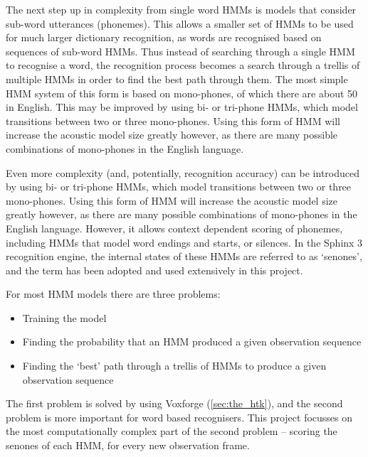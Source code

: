 		The next step up in complexity from single word HMMs is models that consider sub-word utterances (phonemes).  This allows a smaller set of HMMs to be used for much larger dictionary recognition, as words are recognised based on sequences of sub-word HMMs.  Thus instead of searching through a single HMM to recognise a word, the recognition process becomes a search through a trellis of multiple HMMs in order to find the best path through them.  The most simple HMM system of this form is based on mono-phones, of which there are about 50 in English.  This may be improved by using bi- or tri-phone HMMs, which model transitions between two or three mono-phones.  Using this form of HMM will increase the acoustic model size greatly however, as there are many possible combinations of mono-phones in the English language.

		Even more complexity (and, potentially, recognition accuracy) can be introduced by using bi- or tri-phone HMMs, which model transitions between two or three mono-phones.  Using this form of HMM will increase the acoustic model size greatly however, as there are many possible combinations of mono-phones in the English language.  However, it allows context dependent scoring of phonemes, including HMMs that model word endings and starts, or silences.  In the Sphinx 3 recognition engine, the internal states of these HMMs are referred to as `senones', and the term has been adopted and used extensively in this project.

		For most HMM models there are three problems: 
		\begin{itemize}
			\item Training the model
			\item Finding the probability that an HMM produced a given observation sequence
			\item Finding the `best' path through a trellis of HMMs to produce a given observation sequence
		\end{itemize}
		The first problem is solved by using Voxforge (\ref{sec:the_htk}), and the second problem is more important for word based recognisers.  This project focusses on the most computationally complex part of the second problem -- scoring the senones of each HMM, for every new observation frame.

